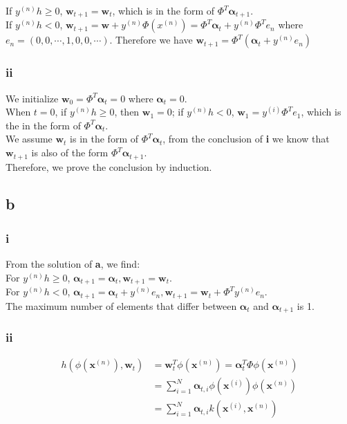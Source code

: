 \documentclass{article}
\begin{document}
If $y^{(n)}h \geq 0$, $\mathbf{w}_{t+1} = \mathbf{w}_{t}$, which is in the form of $\Phi^T\mathbf{\alpha}_{t+1}$. \\
If $y^{(n)}h < 0$, $\mathbf{w}_{t+1} = \mathbf{w} + y^{(n)}\Phi(x^{(n)}) = \Phi^T\mathbf{\alpha}_{t} + y^{(n)}\Phi^Te_n$ where $e_n=(0,0,\cdots,1,0,0,\cdots)$. Therefore we have $\mathbf{w}_{t+1} = \Phi^T(\mathbf{\alpha}_t + y^{(n)}e_n)$

\subsubsection*{ii}

We initialize $\mathbf{w}_0 = \Phi^T \mathbf{\alpha}_t = 0$ where $\mathbf{\alpha}_t = 0$. \\
When $t = 0$, if $y^{(n)}h \geq 0$, then $\mathbf{w}_1 = 0$; if $y^{(n)}h < 0$, $\mathbf{w}_1 = y^{(i)} \Phi^T e_1$, which is the in the form of $\Phi^T \mathbf{\alpha}_t$. \\
We assume $\mathbf{w}_t$ is in the form of $\Phi^T \mathbf{\alpha}_t$, from the conclusion of \textbf{i} we know that $\mathbf{w}_{t+1}$ is also of the form $\Phi^T \mathbf{\alpha}_{t+1}$. \\
Therefore, we prove the conclusion by induction.

\subsection*{b}

\subsubsection*{i}

From the solution of \textbf{a}, we find: \\
For $y^{(n)}h \geq 0$, $\mathbf{\alpha}_{t+1} = \mathbf{\alpha}_t, \mathbf{w}_{t+1} = \mathbf{w}_t$. \\
For $y^{(n)}h < 0$,  $\mathbf{\alpha}_{t+1} = \mathbf{\alpha}_t + y^{(n)}e_n, \mathbf{w}_{t+1} = \mathbf{w}_t + \Phi^T y^{(n)}e_n$. \\
The maximum number of elements that differ between $\mathbf{\alpha}_t$ and $\mathbf{\alpha}_{t+1}$ is 1.

\subsubsection*{ii}

$$
\begin{aligned}
h(\phi(\boldsymbol{x}^{(n)}), \boldsymbol{w}_{t}) &=\boldsymbol{w}_{t}^{T} \phi(\boldsymbol{x}^{(n)}) = \mathbf{\alpha}_{t}^{T} \Phi \phi(\boldsymbol{x}^{(n)}) \\
&=\sum_{i=1}^{N} \mathbf{\alpha}_{t, i} \phi(\boldsymbol{x}^{(i)}) \phi(\boldsymbol{x}^{(n)}) \\
&=\sum_{i=1}^{N} \mathbf{\alpha}_{t, i} k(\boldsymbol{x}^{(i)}, \boldsymbol{x}^{(n)})
\end{aligned}
$$
\end{document}
